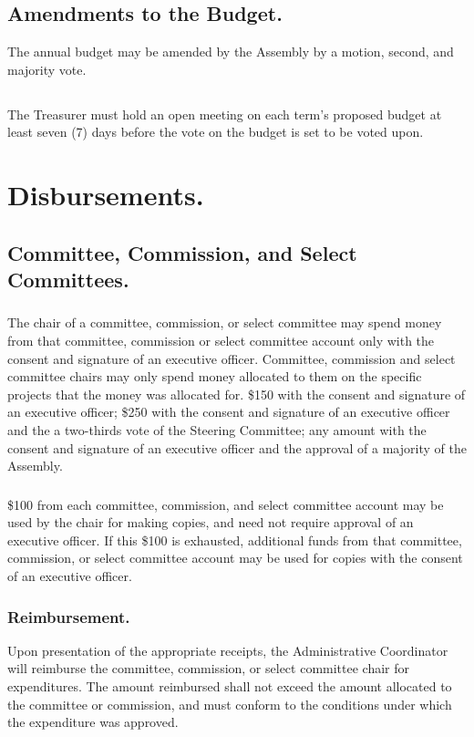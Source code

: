 \subsection{Amendments to the Budget.}
The annual budget may be amended by the Assembly by a motion, second, and majority vote.

\subsection{}
The Treasurer must hold an open meeting on each term’s proposed budget at least seven (7) days before the vote on the budget is set to be voted upon.


\section{Disbursements.}

\subsection{Committee, Commission, and Select Committees.}
\subsubsection{}
The chair of a committee, commission, or select committee may spend money from that committee, commission or select committee account only with the consent and signature of an executive officer. Committee, commission and select committee chairs may only spend money allocated to them on the specific projects that the money was allocated for.
\subsubsubsection{}
\$150 with the consent and signature of an executive officer;
\subsubsubsection{}
\$250 with the consent and signature of an executive officer and the a two-thirds vote of the Steering Committee;
\subsubsubsection{}
any amount with the consent and signature of an executive officer and the approval of a majority of the Assembly.
\subsubsection{}
\$100 from each committee, commission, and select committee account may be used by the chair for making copies, and need not require approval of an executive officer.  If this \$100 is exhausted, additional funds from that committee, commission, or select committee account may be used for copies with the consent of an executive officer.
\subsubsection{Reimbursement.}
Upon presentation of the appropriate receipts, the Administrative Coordinator will reimburse the committee, commission, or select committee chair for expenditures.  The amount reimbursed shall not exceed the amount allocated to the committee or commission, and must conform to the conditions under which the expenditure was approved.
